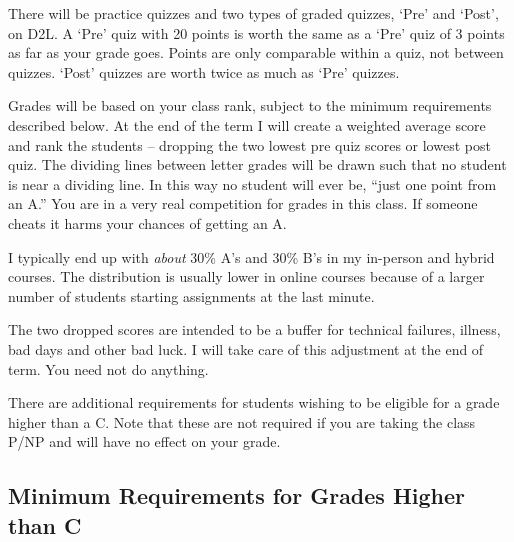 \documentclass[letterpaper,10pt]{article}
\begin{document}
There will be practice quizzes and two types of graded quizzes, `Pre' and `Post', on D2L.  A `Pre'
quiz with 20 points is worth the same as a `Pre' quiz of 3 points as
far as your grade goes.  Points are only comparable within a quiz, not
between quizzes.  `Post' quizzes are worth twice as much as `Pre' quizzes.
% 


Grades will be based on your class rank, subject to the minimum
requirements described below. At the end of the term I will create a
weighted average score and rank the students -- dropping the two
lowest pre quiz scores or lowest post quiz. The dividing lines between letter grades will be
drawn such that no student is near a dividing line. In this way no
student will ever be, ``just one point from an A.'' You are in a very
real competition for grades in this class. If someone cheats it harms
your chances of getting an A. 

I typically end up with \emph{about} 30\%
A's and 30\% B's in my in-person and hybrid courses.  The distribution is usually lower in online courses because of a larger number of students starting assignments at the last minute.   

The two dropped scores are intended to be a buffer for technical
failures, illness, bad days and other bad luck.  I will take care of
this adjustment at the end of term.  You need not do anything.


There are additional requirements for students wishing to be eligible for a grade higher than a C.  Note that these are not required if you are taking the class P/NP and will have no effect on your grade.


\subsection{Minimum Requirements for Grades Higher than C}
\end{document}
